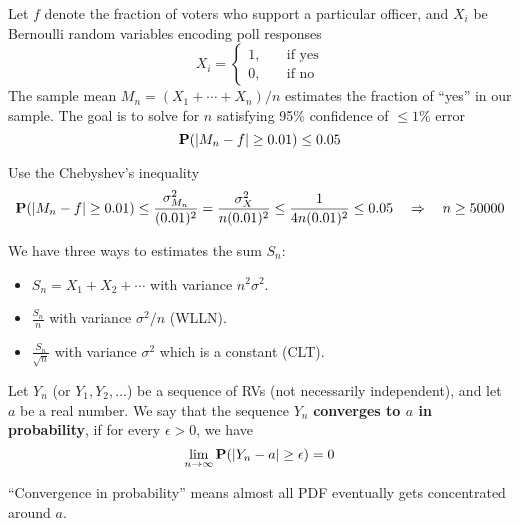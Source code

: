 \begin{example}
    Let $f$ denote the fraction of voters who support a particular officer, and $X_i$ be Bernoulli random variables encoding poll responses
    \begin{equation}
        X_i = \left\{\begin{aligned}
            1, \quad &\text{if yes} \\
            0, \quad &\text{if no}
        \end{aligned}\right.
    \end{equation}
    The sample mean $M_n = (X_1 + \cdots + X_n) / n$ estimates the fraction of ``yes'' in our sample. The goal is to solve for $n$ satisfying 95\% confidence of $\leq 1\%$ error
    \begin{equation}
        \mathbf{P}(\abs{M_n - f} \geq 0.01) \leq 0.05
    \end{equation}
\end{example}
\begin{solution}
    Use the Chebyshev's inequality
    \begin{equation}
        \mathbf{P}(\abs{M_n - f} \geq 0.01) \leq \frac{\sigma_{M_n}^2}{(0.01)^2} = \frac{\sigma_X^2}{n(0.01)^2} \leq \frac{1}{4n(0.01)^2} \leq 0.05 \quad\Rightarrow\quad n \geq 50000
    \end{equation}
\end{solution}

We have three ways to estimates the sum $S_n$:
\begin{itemize}
    \item $S_n = X_1 + X_2 + \cdots$ with variance $n^2 \sigma^2$.
    \item $\frac{S_n}{n}$ with variance $\sigma^2/n$ (WLLN).
    \item $\frac{S_n}{\sqrt{n}}$ with variance $\sigma^2$ which is a constant (CLT).
\end{itemize}

\begin{theorem}
    Let ${Y_n}$ (or $Y_1 ,Y_2, \ldots$) be a sequence of RVs (not necessarily independent), and let $a$ be a real number. We say that the sequence $Y_n$ \textbf{converges to $a$ in probability}, if for every $\epsilon > 0$, we have
    \begin{equation}
        \lim_{n \to \infty} \mathbf{P}(\abs{Y_n - a} \geq \epsilon) = 0
    \end{equation}
\end{theorem}
``Convergence in probability'' means almost all PDF eventually gets concentrated around $a$.


